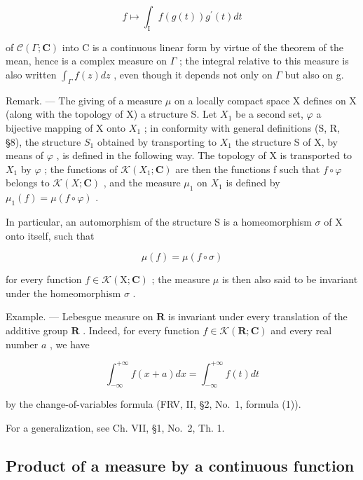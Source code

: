 \[
f \mapsto \int_ {\mathrm{I}} f (g (t)) g ^ {\prime} (t) d t
\]

of \(\mathcal{C}(\Gamma;\mathbf{C})\) into C is a continuous linear form by virtue of the theorem of the mean, hence is a complex measure on \(\Gamma\) ; the integral relative to this measure is also written \(\int_{\Gamma} f(z) dz\) , even though it depends not only on \(\Gamma\) but also on g.

Remark. --- The giving of a measure \(\mu\) on a locally compact space X defines on X (along with the topology of X) a structure S. Let \(X_{1}\) be a second set, \(\varphi\) a bijective mapping of X onto \(X_{1}\) ; in conformity with general definitions (S, R, §8), the structure \(S_{1}\) obtained by transporting to \(X_{1}\) the structure S of X, by means of \(\varphi\) , is defined in the following way. The topology of X is transported to \(X_{1}\) by \(\varphi\) ; the functions of \(\mathcal{K}(X_{1};\mathbf{C})\) are then the functions f such that \(f \circ \varphi\) belongs to \(\mathcal{K}(X;\mathbf{C})\) , and the measure \(\mu_{1}\) on \(X_{1}\) is defined by \(\mu_{1}(f) = \mu(f \circ \varphi)\) .

In particular, an automorphism of the structure S is a homeomorphism \(\sigma\) of X onto itself, such that

\[
\mu (f) = \mu (f \circ \sigma)
\]

for every function \(f \in \mathcal{K}(\mathrm{X};\mathbf{C})\) ; the measure \(\mu\) is then also said to be invariant under the homeomorphism \(\sigma\) .

Example. --- Lebesgue measure on \(\mathbf{R}\) is invariant under every translation of the additive group \(\mathbf{R}\) . Indeed, for every function \(f \in \mathcal{K}(\mathbf{R}; \mathbf{C})\) and every real number \(a\) , we have

\[
\int_ {- \infty} ^ {+ \infty} f (x + a) d x = \int_ {- \infty} ^ {+ \infty} f (t) d t
\]

by the change-of-variables formula (FRV, II, §2, No.~1, formula (1)).

For a generalization, see Ch. VII, §1, No.~2, Th. 1.

\subsection{Product of a measure by a continuous function}

